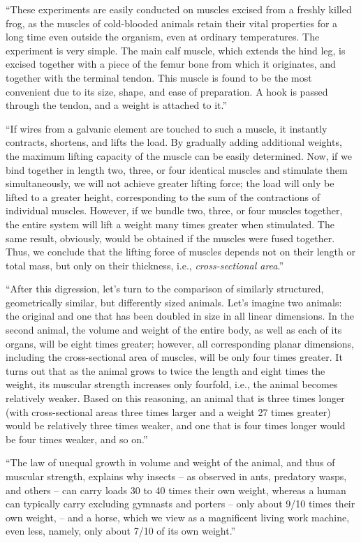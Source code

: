 ``These experiments are easily conducted on muscles excised from a freshly killed frog, as the muscles of cold-blooded animals retain their vital properties for a long time even outside the organism, even at ordinary temperatures. The experiment is very simple. The main calf muscle, which extends the hind leg, is excised together with a piece of the femur bone from which it originates, and together with the terminal tendon. This muscle is found to be the most convenient due to its size, shape, and ease of preparation. A hook is passed through the tendon, and a weight is attached to it.'' 



``If wires from a galvanic element are touched to such a muscle, it instantly contracts, shortens, and lifts the load. By gradually adding additional weights, the maximum lifting capacity of the muscle can be easily determined. Now, if we bind together in length two, three, or four identical muscles and stimulate them simultaneously, we will not achieve greater lifting force; the load will only be lifted to a greater height, corresponding to the sum of the contractions of individual muscles. However, if we bundle two, three, or four muscles together, the entire system will lift a weight many times greater when stimulated. The same result, obviously, would be obtained if the muscles were fused together. Thus, we conclude that the lifting force of muscles depends not on their length or total mass, but only on their thickness, i.e., \emph{cross-sectional area}.''

``After this digression, let's turn to the comparison of similarly structured, geometrically similar, but differently sized animals. Let's imagine two animals: the original and one that has been doubled in size in all linear dimensions. In the second animal, the volume and weight of the entire body, as well as each of its organs, will be eight times greater; however, all corresponding planar dimensions, including the cross-sectional area of muscles, will be only four times greater. It turns out that as the animal grows to twice the length and eight times the weight, its muscular strength increases only fourfold, i.e., the animal becomes relatively weaker. Based on this reasoning, an animal that is three times longer (with cross-sectional areas three times larger and a weight 27 times greater) would be relatively three times weaker, and one that is four times longer would be four times weaker, and so on.''

``The law of unequal growth in volume and weight of the animal, and thus of muscular strength, explains why insects -- as observed in ants, predatory wasps, and others -- can carry loads 30 to 40 times their own weight, whereas a human can typically carry excluding gymnasts and porters -- only about 9/10 times their own weight, -- and a horse, which we view as a magnificent living work machine, even less, namely, only about 7/10 of its own weight.''

